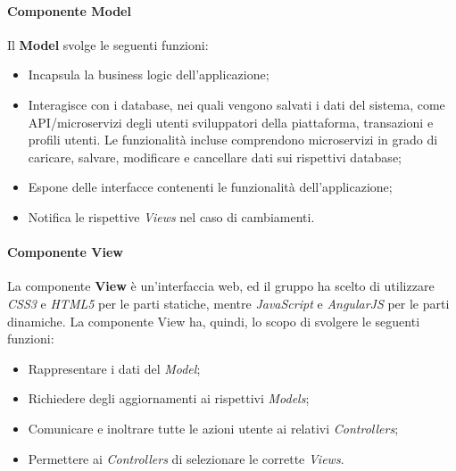 \paragraph{Componente Model}
Il \textbf{Model} svolge le seguenti funzioni:
\begin{itemize}
	\item Incapsula la business logic dell'applicazione;
	
	\item Interagisce con i database, nei quali vengono salvati i dati del sistema, come API/microservizi degli utenti sviluppatori della piattaforma, transazioni e profili utenti. Le funzionalità incluse comprendono microservizi in grado di caricare, salvare, modificare e cancellare dati sui rispettivi database;
	
	\item Espone delle interfacce contenenti le funzionalità dell'applicazione;
	
	\item Notifica le rispettive \textit{Views} nel caso di cambiamenti.
\end{itemize}

\paragraph{Componente View}
La componente \textbf{View} è un'interfaccia web, ed il gruppo ha scelto di utilizzare \textit{CSS3} e \textit{HTML5} per le parti statiche, mentre \textit{JavaScript} e \textit{AngularJS} per le parti dinamiche. 
La componente View ha, quindi, lo scopo di svolgere le seguenti funzioni:
\begin{itemize}
	\item Rappresentare i dati del \textit{Model};
	
	\item Richiedere degli aggiornamenti ai rispettivi \textit{Models};
	
	\item Comunicare e inoltrare tutte le azioni utente ai relativi \textit{Controllers};
	
	\item Permettere ai \textit{Controllers} di selezionare le corrette \textit{Views}.
\end{itemize} 

